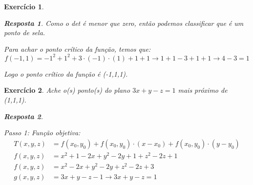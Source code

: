 \documentclass{article}
\newtheorem{ex}{Exercício}
\newtheorem{resp}{Resposta}
\begin{document}
\begin{ex}
\begin{resp}
    Como o det é menor que zero, então podemos classificar que é um ponto de sela.

    Para achar o ponto crítico da função, temos que:
    \[f(-1,1)=-1^2+1^2+3\cdot(-1)\cdot(1)+1+1 \to 1+1-3+1+1 \to 4-3=1\]
    
    Logo o ponto crítico da função é (-1,1,1).
\end{resp}
\end{ex}

\begin{ex}
    Ache o(s) ponto(s) do plano $3x+y-z=1$ mais próximo de (1,1,1).
\begin{resp}
    
\end{resp}

\item Passo 1: Função objetiva:
    \begin{align*}
    T(x,y,z)&=f(x_0,y_0)+f(x_0,y_0)\cdot(x-x_0)+f(x_0,y_0)\cdot(y-y_0)\\
    f(x,y,z)&=x^2+1-2x+y^2-2y+1+z^2-2z+1\\
    f(x,y,z)&=x^2-2x+y^2-2y+z^2-2z+3\\
    g(x,y,z)&=3x+y-z-1 \to 3x+y-z=1
    \end{align*}
    

\end{ex}
\end{document}
